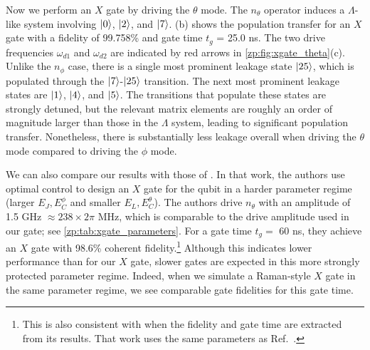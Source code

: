 Now we perform an $X$ gate by driving the $\theta$ mode.
The $n_\theta$ operator induces a $\Lambda$-like system involving $\ket{0}$, $\ket{2}$, and $\ket{7}$.
(b) shows the population transfer for an $X$ gate with a fidelity of 99.758\% and gate time $t_g$ = 25.0 ns.
The two drive frequencies $\omega_{d1}$ and $\omega_{d2}$ are indicated by red arrows in \cref{zp:fig:xgate_theta}(c).
Unlike the $n_\phi$ case, there is a single most prominent leakage state $\ket{25}$, which is populated through the $\ket{7}$-$\ket{25}$ transition.
The next most prominent leakage states are $ \ket{1}$, $\ket{4}$, and $\ket{5}$.
The transitions that populate these states are strongly detuned, but the relevant matrix elements are roughly an order of magnitude larger than those in the $\Lambda$ system, leading to significant population transfer.
Nonetheless, there is substantially less leakage overall when driving the $\theta$ mode compared to driving the $\phi$ mode.

We can also compare our results with those of \citet{abdelhafez2020universal}.
In that work, the authors use optimal control to design an $X$ gate for the \zps qubit in a harder parameter regime (larger $E_J, E_C^\phi$ and smaller $E_L,E_C^\theta$).
The authors drive $n_\theta$ with an amplitude of 1.5 GHz $\approx 238\times 2\pi$ MHz, which is comparable to the drive amplitude used in our gate; see \cref{zp:tab:xgate_parameters}.
For a gate time $t_g=$ 60 ns, they achieve an $X$ gate with 98.6\% coherent fidelity.\footnote{This is also consistent with \citet{paolo_control_2019} when the fidelity and gate time are extracted from its results.
That work uses the same parameters as Ref.~\cite{abdelhafez2020universal}.}
Although this indicates lower performance than for our $X$ gate, slower gates are expected in this more strongly protected \zps parameter regime.
Indeed, when we simulate a Raman-style $X$ gate in the same parameter regime, we see comparable gate fidelities for this gate time.

